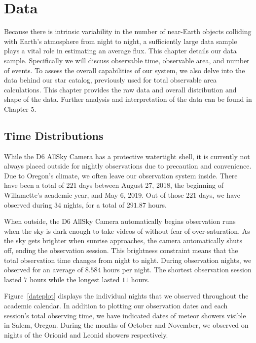 \chapter{Data}

Because there is intrinsic variability in the number of near-Earth objects colliding with Earth's atmosphere from night to night, a sufficiently large data sample plays a vital role in estimating an average flux.
This chapter details our data sample.
Specifically we will discuss observable time, observable area, and number of events.  
To assess the overall capabilities of our system, we also delve into the data behind our star catalog, previously used for total observable area calculations.  
This chapter provides the raw data and overall distribution and shape of the data. Further analysis and interpretation of the data can be found in Chapter 5.

\section{Time Distributions}

While the D6 AllSky Camera has a protective watertight shell, it is currently not always placed outside for nightly observations due to precaution and convenience.
Due to Oregon's climate, we often leave our observation system inside.
There have been a total of $221$ days between August 27, 2018, the beginning of Willamette's academic year, and May 6, 2019.
Out of those $221$ days, we have observed during $34$ nights, for a total of $291.87$ hours.

When outside, the D6 AllSky Camera automatically begins observation runs when the sky is dark enough to take videos of without fear of over-saturation.
As the sky gets brighter when sunrise approaches, the camera automatically shuts off, ending the observation session.
This brightness constraint means that the total observation time changes from night to night.
During observation nights, we observed for an average of $8.584$ hours per night.
The shortest observation session lasted $7$ hours while the longest lasted $11$ hours.

Figure~\ref{dateplot} displays the individual nights that we observed throughout the academic calendar. 
In addition to plotting our observation dates and each session's total observing time, we have indicated dates of meteor showers visible in Salem, Oregon.  
During the months of October and November, we observed on nights of the Orionid and Leonid showers respectively.  

